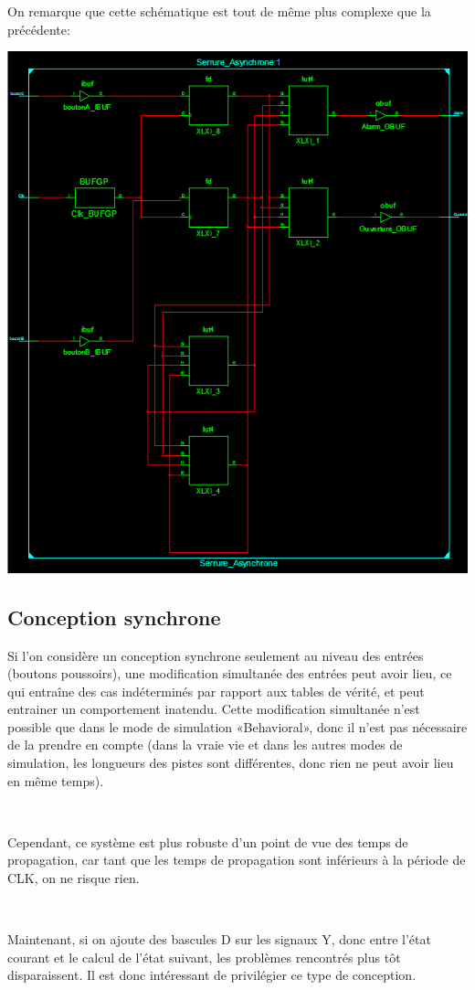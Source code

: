 \documentclass{article}
\begin{document}
On remarque que cette schématique est tout de même plus complexe que la précédente:

\includegraphics[width=\linewidth]{Serrure_Assynchrone_Sch.png}

\subsection{Conception synchrone}

Si l’on considère un conception synchrone seulement au niveau des entrées (boutons poussoirs), une modification simultanée des entrées peut avoir lieu, ce qui entraîne des cas indéterminés par rapport aux tables de vérité, et peut entrainer un comportement inatendu. Cette modification simultanée n’est possible que dans le mode de simulation «Behavioral», donc il n’est pas nécessaire de la prendre en compte (dans la vraie vie et dans les autres modes de simulation, les longueurs des pistes sont différentes, donc rien ne peut avoir lieu en même temps).

~

Cependant, ce système est plus robuste d’un point de vue des temps de propagation, car tant que les temps de propagation sont inférieurs à la période de CLK, on ne risque rien.

~

Maintenant, si on ajoute des bascules D sur les signaux Y, donc entre l’état courant et le calcul de l’état suivant, les problèmes rencontrés plus tôt disparaissent.
Il est donc intéressant de privilégier ce type de conception.
\end{document}

